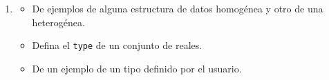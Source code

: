 \documentclass[landscape,a5paper,10pt]{article}
\begin{document}
\begin{enumerate}
\item
    \begin{itemize}
        \item [a-] De ejemplos de alguna estructura de datos homog\'enea y otro de una heterog\'enea.
        \item [b-] Defina el \verb=type= de un conjunto de reales.
        \item [c-] De un ejemplo de un tipo definido por el usuario.
    \end{itemize}

\end{enumerate}
\end{document}
